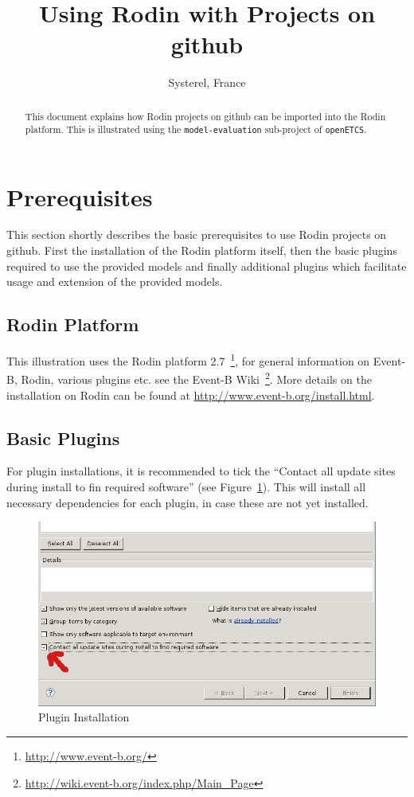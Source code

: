 \documentclass[10pt,a4paper]{article}
\title{Using Rodin with Projects on github}
\author{Systerel, France}
\date{}
\begin{document}
\maketitle

\begin{abstract}
  This document explains how Rodin projects on github can be imported into the
  Rodin platform. This is illustrated using the \texttt{model-evaluation}
  sub-project of \texttt{openETCS}.
\end{abstract}

\section{Prerequisites}
\label{sec:prerequisites}

This section shortly describes the basic prerequisites to use Rodin projects on
github. First the installation of the Rodin platform itself, then the basic
plugins required to use the provided models and finally additional plugins which
facilitate usage and extension of the provided models.

\subsection{Rodin Platform}
\label{sec:rodin-platform}

This illustration uses the Rodin platform
2.7~\footnote{\url{http://www.event-b.org/}}, for general information on
Event-B, Rodin, various plugins etc. see the Event-B
Wiki~\footnote{\url{http://wiki.event-b.org/index.php/Main_Page}}. More details
on the installation on Rodin can be found
at {\url{http://www.event-b.org/install.html}}.

\subsection{Basic Plugins}
\label{sec:basic-plugins}

For plugin installations, it is recommended to tick the ``Contact all update
sites during install to fin required software'' (see
Figure~\ref{fig:plugin-install}). This will install all necessary dependencies
for each plugin, in case these are not yet installed.

\begin{figure}[ht]
  \centering
  \includegraphics[width=.75\textwidth]{install-plugin}
  \caption{Plugin Installation}
  \label{fig:plugin-install}
\end{figure}
\end{document}
